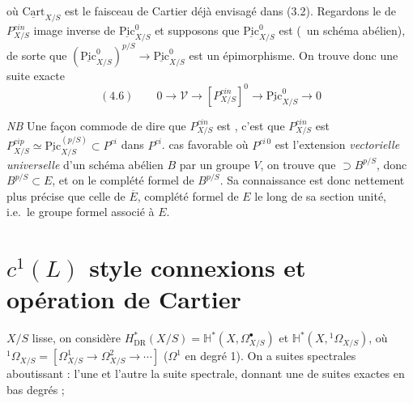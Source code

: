 \documentclass[11pt,a4paper]{article}
\begin{document}
où $\underline{\mathrm{Cart}}_{X/S}$ est le faisceau de Cartier déjà envisagé dans (3.2). Regardons le  de \struck{\ill{}} $P^{cin}_{X/S}$ image inverse de $\underline{\mathrm{Pic}}^{0}_{X/S}$ et supposons que $\underline{\mathrm{Pic}}^{0}_{X/S}$ est  (\ un schéma abélien), de sorte que $(\underline{\mathrm{Pic}}^{0}_{X/S})^{p/S} \to \underline{\mathrm{Pic}}^{0}_{X/S}$ est un épimorphisme. On trouve donc une suite exacte
\[
(4.6) \qquad 0 \to \mathcal{V} \to [P^{cin}_{X/S}]^{0} \to \underline{\mathrm{Pic}}^{0}_{X/S} \to 0
\]

\emph{NB} Une façon commode de dire que $P^{cin}_{X/S}$ est , c'est  que $P^{cin}_{X/S}$ est  $P^{cip}_{X/S} \simeq \underline{\mathrm{Pic}}^{(p/S)}_{X/S} \subset P^{ci}$ dans $P^{ci}$.   cas favorable où $P^{ci\,0}$ est l'extension \emph{vectorielle universelle}  d'un schéma abélien $B$ par un groupe  $V$, on trouve que   $\supset B^{p/S}$, donc $B^{p/S} \subset E$, et on   le complété formel   de $B^{p/S}$. Sa connaissance est donc nettement plus précise que celle de $\overline{E}$, complété formel de $E$ le long de sa section unité, i.e.\ le groupe formel associé à $E$.

\section{$c^{1}(L)$ style connexions et opération de Cartier}

$X/S$ lisse, on considère $H^{*}_{\mathrm{DR}}(X/S) = \mathbb{H}^{*}(X, \Omega^{\bullet}_{X/S})$ et $\mathbb{H}^{*}(X, {}^{1}\Omega_{X/S})$, où ${}^{1}\Omega_{X/S} = [\Omega^{1}_{X/S} \to \Omega^{2}_{X/S} \to \cdots]$ ($\Omega^{1}$ en degré 1). On a suites spectrales aboutissant : l'une et l'autre \ill{} \ill{} la suite spectrale, donnant une \ill{} de suites exactes en bas degrés ;
\end{document}
